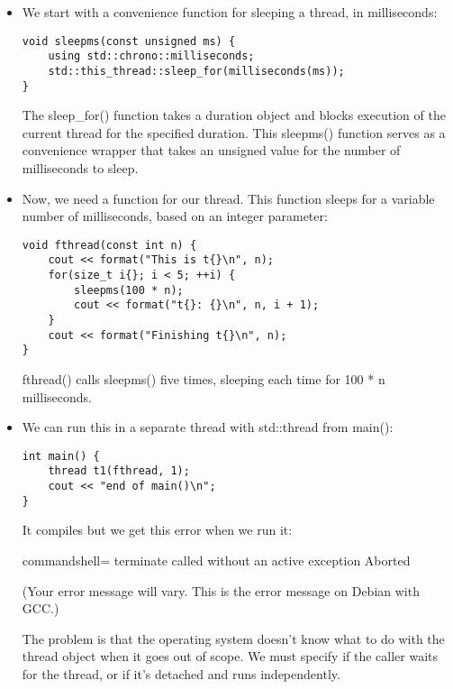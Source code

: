 \begin{itemize}
\item 
We start with a convenience function for sleeping a thread, in milliseconds:

\begin{lstlisting}[style=styleCXX]
void sleepms(const unsigned ms) {
	using std::chrono::milliseconds;
	std::this_thread::sleep_for(milliseconds(ms));
}
\end{lstlisting}

The sleep\_for() function takes a duration object and blocks execution of the current thread for the specified duration. This sleepms() function serves as a convenience wrapper that takes an unsigned value for the number of milliseconds to sleep.

\item 
Now, we need a function for our thread. This function sleeps for a variable number of milliseconds, based on an integer parameter:

\begin{lstlisting}[style=styleCXX]
void fthread(const int n) {
	cout << format("This is t{}\n", n);
	for(size_t i{}; i < 5; ++i) {
		sleepms(100 * n);
		cout << format("t{}: {}\n", n, i + 1);
	}
	cout << format("Finishing t{}\n", n);
}
\end{lstlisting}

fthread() calls sleepms() five times, sleeping each time for 100 * n milliseconds.

\item 
We can run this in a separate thread with std::thread from main():

\begin{lstlisting}[style=styleCXX]
int main() {
	thread t1(fthread, 1);
	cout << "end of main()\n";
}
\end{lstlisting}

It compiles but we get this error when we run it:

\begin{tcblisting}{commandshell={}}
terminate called without an active exception Aborted
\end{tcblisting}

(Your error message will vary. This is the error message on Debian with GCC.) 

The problem is that the operating system doesn't know what to do with the thread object when it goes out of scope. We must specify if the caller waits for the thread, or if it's detached and runs independently.


\end{itemize}
